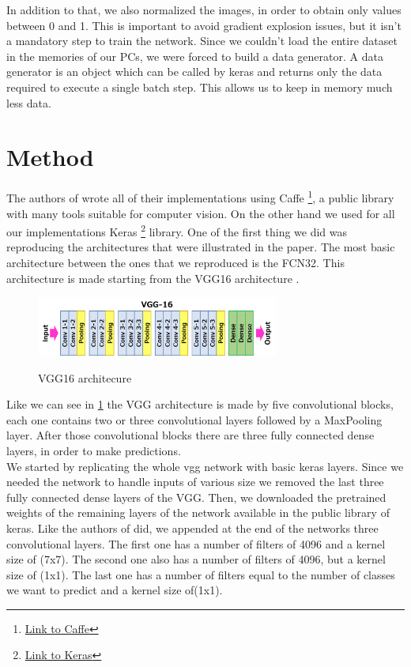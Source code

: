 \documentclass[10pt,twocolumn,letterpaper]{article}
\begin{document}
In addition to that, we also normalized the images, in order to obtain only values between 0 and 1. This is important to avoid gradient explosion issues, but it isn't a mandatory step to train the network.
Since we couldn't load the entire dataset in the memories of our PCs, we were forced to build a data generator. A data generator is an object which can be called by keras and returns only the data required to execute a single batch step. This allows us to keep in memory much less data.

\section{Method}

The authors of \cite{projectPaper} wrote all of their implementations using Caffe \footnote{\href{https://caffe.berkeleyvision.org/}{Link to Caffe}}, a public library with many tools suitable for computer vision. On the other hand we used for all our implementations Keras \footnote{\href{https://keras.io/}{Link to Keras}} library.
One of the first thing we did was reproducing the architectures that were illustrated in the paper. The most basic architecture between the ones that we reproduced is the FCN32. This architecture is made starting from the VGG16 architecture \cite{weights}.
\begin{figure}[t]
	\includegraphics[width=8cm]{image/vgg16}
	\label{vgg}
	\centering
	\caption{VGG16 architecure}
\end{figure}
Like we can see in \ref{vgg} the VGG architecture is made by five convolutional blocks, each one contains two or three convolutional layers followed by a MaxPooling layer. After those convolutional blocks there are three fully connected dense layers, in order to make predictions. \\
We started by replicating the whole vgg network with basic keras layers. Since we needed the network to handle inputs of various size we removed the last three fully connected dense layers of the VGG. Then, we downloaded the pretrained weights of the remaining layers of the network available in the public library of keras.
Like the authors of \cite{projectPaper} did, we appended at the end of the networks three convolutional layers. The first one has a number of filters of 4096 and a kernel size of (7x7). The second one also has a number of filters of 4096, but a kernel size of (1x1). The last one has a number of filters equal to the number of classes we want to predict and a kernel size of(1x1).
\end{document}

